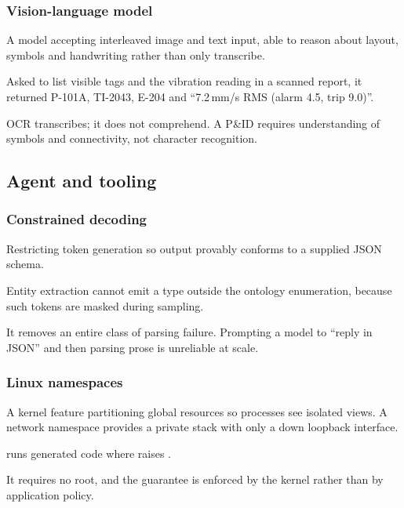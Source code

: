 \subsubsection{Vision-language model}
\begin{description}[leftmargin=0pt,style=nextline]
\item[Definition.] A model accepting interleaved image and text input, able to
reason about layout, symbols and handwriting rather than only transcribe.
\item[Example.] Asked to list visible tags and the vibration reading in a
scanned report, it returned P-101A, TI-2043, E-204 and
``7.2\,mm/s RMS (alarm 4.5, trip 9.0)''.
\item[Why chosen.] OCR transcribes; it does not comprehend. A P\&ID requires
understanding of symbols and connectivity, not character recognition.
\end{description}

\subsection{Agent and tooling}

\subsubsection{Constrained decoding}
\begin{description}[leftmargin=0pt,style=nextline]
\item[Definition.] Restricting token generation so output provably conforms to
a supplied JSON schema.
\item[Example.] Entity extraction cannot emit a type outside the ontology
enumeration, because such tokens are masked during sampling.
\item[Why chosen.] It removes an entire class of parsing failure. Prompting a
model to ``reply in JSON'' and then parsing prose is unreliable at scale.
\end{description}

\subsubsection{Linux namespaces}
\begin{description}[leftmargin=0pt,style=nextline]
\item[Definition.] A kernel feature partitioning global resources so processes
see isolated views. A network namespace provides a private stack with only a
down loopback interface.
\item[Example.]  runs generated code where
 raises
.
\item[Why chosen.] It requires no root, and the guarantee is enforced by the
kernel rather than by application policy.
\end{description}

